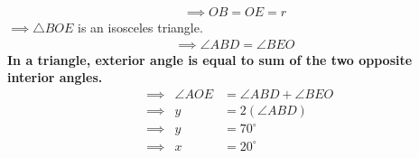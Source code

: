 \documentclass[journal,12pt,twocolumn]{IEEEtran}
\begin{document}
\begin{enumerate}[label=,ref=]
 \begin {align} 
\implies OB=OE=r
\end{align} 
 $\implies \triangle BOE$ is an isosceles triangle.\\
 \begin{align} 
 \implies \angle ABD=\angle BEO
 \end{align}  
\textbf{In a triangle, exterior angle is equal to sum of the two opposite interior angles.}\\
\begin{align}
&\implies &\angle AOE&=\angle ABD+\angle BEO\\
&\implies &y&=2(\angle ABD)\\
&\implies &y&=70^\circ\\
&\implies &x&=20^\circ
\end{align}  

 
 
                
\end{enumerate}
\end{document}
